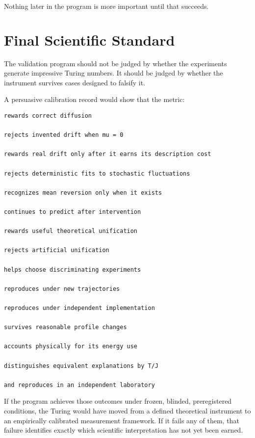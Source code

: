 \documentclass[11pt]{article}
\begin{document}
Nothing later in the program is more important until that succeeds.

\section{Final Scientific Standard}

The validation program should not be judged by whether the experiments generate impressive Turing numbers. It should be judged by whether the instrument survives cases designed to falsify it.

A persuasive calibration record would show that the metric:
\begin{verbatim}
rewards correct diffusion

rejects invented drift when mu = 0

rewards real drift only after it earns its description cost

rejects deterministic fits to stochastic fluctuations

recognizes mean reversion only when it exists

continues to predict after intervention

rewards useful theoretical unification

rejects artificial unification

helps choose discriminating experiments

reproduces under new trajectories

reproduces under independent implementation

survives reasonable profile changes

accounts physically for its energy use

distinguishes equivalent explanations by T/J

and reproduces in an independent laboratory
\end{verbatim}

If the program achieves those outcomes under frozen, blinded, preregistered conditions, the Turing would have moved from a defined theoretical instrument to an empirically calibrated measurement framework. If it fails any of them, that failure identifies exactly which scientific interpretation has not yet been earned.
\end{document}

